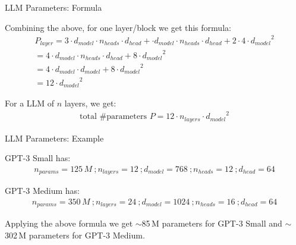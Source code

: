 
\begin{vbframe}{LLM Parameters: Formula}

\vfill

Combining the above, for one layer/block we get this formula:
\begin{equation*}
\begin{array}{c}
P_{layer} = 3 \cdot d_{model} \cdot n_{heads} \cdot d_{head} + \cdot d_{model} \cdot n_{heads} \cdot d_{head} + 2 \cdot 4 \cdot {d_{model}}^2 \\ [8pt]
 = 4 \cdot d_{model} \cdot n_{heads} \cdot d_{head} + 8 \cdot {d_{model}}^2 \\ [8pt]
 = 4 \cdot d_{model} \cdot d_{model} + 8 \cdot {d_{model}}^2 \\ [8pt]
 = 12 \cdot {d_{model}}^2
\end{array}
\end{equation*}

\vskip5mm

For a LLM of $n$ layers, we get:
\begin{equation*}
\begin{array}{c}
\mbox{total \# parameters\ \ } P = 12 \cdot n_{layers} \cdot {d_{model}}^2
\end{array}
\end{equation*}

\vfill

\end{vbframe}


\begin{vbframe}{LLM Parameters: Example}

\vfill

GPT-3 Small has:
\begin{equation*}
\begin{array}{l}
n_{params} = 125\,M ~; n_{layers} = 12 ~; d_{model} = 768 ~; n_{heads} = 12 ~; d_{head} = 64 
\end{array}
\end{equation*}

\vskip2mm

GPT-3 Medium has:
\begin{equation*}
\begin{array}{l}
n_{params} = 350\,M ~; n_{layers} = 24 ~; d_{model} = 1024 ~; n_{heads} = 16 ~; d_{head} = 64 
\end{array}
\end{equation*}

\vskip2mm

Applying the above formula we get $\sim$85\,M parameters for GPT-3 Small and $\sim$302\,M parameters for GPT-3 Medium. 



\vfill

\end{vbframe}



